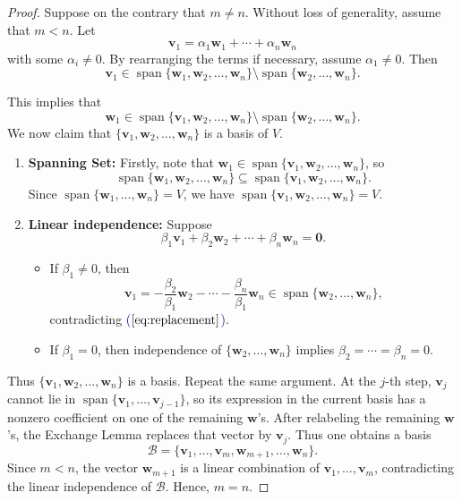 \begin{proof}
Suppose on the contrary that $m \neq n$. Without loss of generality, assume that $m < n$. Let
\[
\mathbf{v}_1 = \alpha_1 \mathbf{w}_1 + \cdots + \alpha_n \mathbf{w}_n
\]
with some $\alpha_i \neq 0$. By rearranging the terms if necessary, assume $\alpha_1 \neq 0$. Then
\begin{equation}\label{eq:replacement}
\mathbf{v}_1 \in \operatorname{span}\{ \mathbf{w}_1, \mathbf{w}_2, \ldots, \mathbf{w}_n \} \setminus \operatorname{span}\{ \mathbf{w}_2, \ldots, \mathbf{w}_n \}.
\end{equation}

This implies that
\[
\mathbf{w}_1 \in \operatorname{span}\{ \mathbf{v}_1, \mathbf{w}_2, \ldots, \mathbf{w}_n \} \setminus \operatorname{span}\{ \mathbf{w}_2, \ldots, \mathbf{w}_n \}.
\]
We now claim that $\{ \mathbf{v}_1, \mathbf{w}_2, \ldots, \mathbf{w}_n \}$ is a basis of $V$.

\begin{enumerate}
  \item \textbf{Spanning Set:} Firstly, note that
  $\mathbf{w}_1 \in \operatorname{span}\{ \mathbf{v}_1, \mathbf{w}_2, \ldots, \mathbf{w}_n \}$, so 
  \[\operatorname{span}\{ \mathbf{w}_1, \mathbf{w}_2, \ldots, \mathbf{w}_n \} \subseteq \operatorname{span}\{ \mathbf{v}_1, \mathbf{w}_2, \ldots, \mathbf{w}_n \}.
  \]
  Since $\operatorname{span}\{ \mathbf{w}_1, \ldots, \mathbf{w}_n \} = V$, we have $\operatorname{span}\{ \mathbf{v}_1, \mathbf{w}_2, \ldots, \mathbf{w}_n \} = V$.

  \item \textbf{Linear independence:} Suppose
  \[
  \beta_1 \mathbf{v}_1 + \beta_2 \mathbf{w}_2 + \cdots + \beta_n \mathbf{w}_n = \mathbf{0}.
  \]
  \begin{itemize}
    \item If $\beta_1 \neq 0$, then
    \[
    \mathbf{v}_1 = -\frac{\beta_2}{\beta_1} \mathbf{w}_2 - \cdots - \frac{\beta_n}{\beta_1} \mathbf{w}_n \in \operatorname{span}\{ \mathbf{w}_2, \ldots, \mathbf{w}_n \},
    \]
    contradicting \textcolor{darkblue}{($\ref{eq:replacement}$)}.

    \item If $\beta_1 = 0$, then independence of $\{ \mathbf{w}_2, \ldots, \mathbf{w}_n \}$ implies $\beta_2 = \cdots = \beta_n = 0$.
  \end{itemize}
\end{enumerate}

Thus $\{ \mathbf{v}_1, \mathbf{w}_2, \ldots, \mathbf{w}_n \}$ is a basis. Repeat the same argument. At the $j$-th step, $\mathbf{v}_j$ cannot lie in $\operatorname{span}\{\mathbf{v}_1,\ldots,\mathbf{v}_{j-1}\}$, so its expression in the current basis has a nonzero coefficient on one of the remaining $\mathbf{w}$'s. After relabeling the remaining $\mathbf{w}$'s, the Exchange Lemma replaces that vector by $\mathbf{v}_j$. Thus one obtains a basis
\[
\mathcal{B}=\{ \mathbf{v}_1, \ldots, \mathbf{v}_m, \mathbf{w}_{m+1}, \ldots, \mathbf{w}_n \}.
\]
Since $m<n$, the vector $\mathbf{w}_{m+1}$ is a linear combination of $\mathbf{v}_1,\ldots,\mathbf{v}_m$, contradicting the linear independence of $\mathcal{B}$. Hence, $m=n$.
\end{proof}

